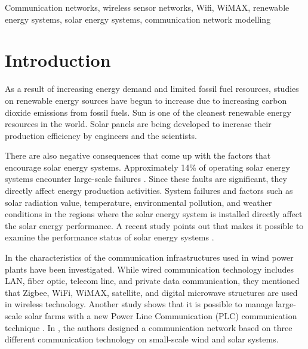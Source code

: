 \documentclass[conference, letterpaper]{IEEEtran}
\begin{document}
\begin{IEEEkeywords}
Communication networks, wireless sensor networks, Wifi, WiMAX, renewable energy systems, solar energy systems, communication network modelling
\end{IEEEkeywords}

\section{Introduction}
As a result of increasing energy demand and limited fossil fuel resources, studies on renewable energy sources have begun to increase due to increasing carbon dioxide emissions from fossil fuels. %
Sun is one of the cleanest renewable energy resources in the world. Solar panels are being developed to increase their production efficiency by engineers and the scientists. 

There are also negative consequences that come up with the factors that encourage solar energy systems. Approximately 14\% of operating solar energy systems encounter large-scale failures \cite{b2}. Since these faults are significant, they directly affect energy production activities. System failures and factors such as solar radiation value, temperature, environmental pollution, and weather conditions in the regions where the solar energy system is installed directly affect the solar energy performance. A recent study points out that makes it possible to examine the performance status of solar energy systems \cite{b3}.

In \cite{b4} the characteristics of the communication infrastructures used in wind power plants have been investigated. While wired communication technology includes LAN, fiber optic, telecom line, and private data communication, they mentioned that Zigbee, WiFi, WiMAX, satellite, and digital microwave structures are used in wireless technology. Another study shows that it is possible to manage large-scale solar farms with a new Power Line Communication (PLC) communication technique \cite{b5}. In \cite{b6}, the authors designed a communication network based on three different communication technology on small-scale wind and solar systems.
\end{document}
